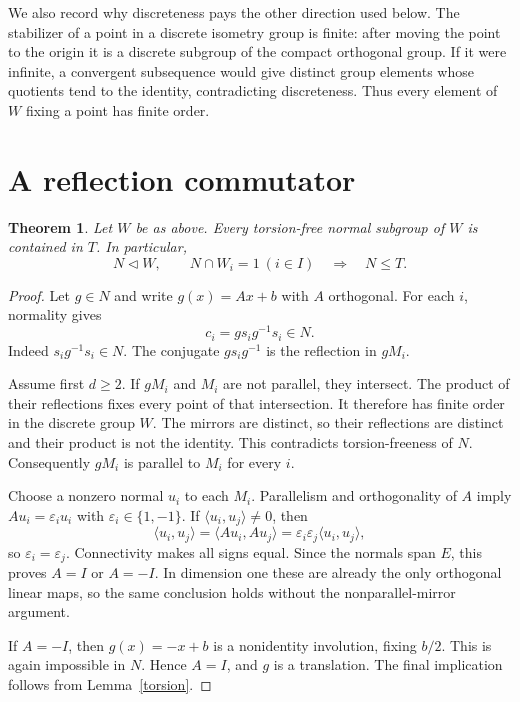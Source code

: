 \documentclass[11pt,a4paper]{article}
\newtheorem{theorem}{Theorem}
\begin{document}
We also record why discreteness pays the other direction used below.
The stabilizer of a point in a discrete isometry group is finite:
after moving the point to the origin it is a discrete subgroup of the
compact orthogonal group. If it were infinite, a convergent subsequence
would give distinct group elements whose quotients tend to the identity,
contradicting discreteness. Thus every element of $W$ fixing a point
has finite order.

\section{A reflection commutator}

\begin{theorem}\label{translation}
Let $W$ be as above. Every torsion-free normal subgroup of $W$ is
contained in $T$. In particular,
\[
 N\triangleleft W,\qquad N\cap W_i=1\ (i\in I)
 \quad\Longrightarrow\quad N\leq T.
\]
\end{theorem}
\begin{proof}
Let $g\in N$ and write $g(x)=Ax+b$ with $A$ orthogonal.
For each $i$, normality gives
\[
                c_i=g s_i g^{-1}s_i\in N.
\]
Indeed $s_i g^{-1}s_i\in N$. The conjugate $g s_i g^{-1}$ is
the reflection in $gM_i$.

Assume first $d\geq2$. If $gM_i$ and $M_i$ are not parallel, they
intersect. The product of their reflections fixes every point of that
intersection. It therefore has finite order in the discrete group $W$.
The mirrors are distinct, so their reflections are distinct and their
product is not the identity. This contradicts torsion-freeness of $N$.
Consequently $gM_i$ is parallel to $M_i$ for every $i$.

Choose a nonzero normal $u_i$ to each $M_i$. Parallelism and
orthogonality of $A$ imply $Au_i=\varepsilon_i u_i$ with
$\varepsilon_i\in\{1,-1\}$. If $\langle u_i,u_j\rangle\ne0$, then
\[
 \langle u_i,u_j\rangle
 =\langle Au_i,Au_j\rangle
 =\varepsilon_i\varepsilon_j\langle u_i,u_j\rangle,
\]
so $\varepsilon_i=\varepsilon_j$. Connectivity makes all signs equal.
Since the normals span $E$, this proves $A=I$ or $A=-I$.
In dimension one these are already the only orthogonal linear maps,
so the same conclusion holds without the nonparallel-mirror argument.

If $A=-I$, then $g(x)=-x+b$ is a nonidentity involution, fixing $b/2$.
This is again impossible in $N$. Hence $A=I$, and $g$ is a translation.
The final implication follows from Lemma~\ref{torsion}.
\end{proof}
\end{document}

